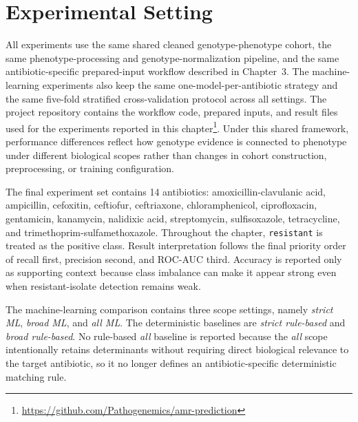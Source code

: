 \section{Experimental Setting}

All experiments use the same shared cleaned genotype-phenotype cohort, the same phenotype-processing and genotype-normalization pipeline, and the same antibiotic-specific prepared-input workflow described in Chapter~3. The machine-learning experiments also keep the same one-model-per-antibiotic strategy and the same five-fold stratified cross-validation protocol across all settings. The project repository contains the workflow code, prepared inputs, and result files used for the experiments reported in this chapter\footnote{\url{https://github.com/Pathogenemics/amr-prediction}}. Under this shared framework, performance differences reflect how genotype evidence is connected to phenotype under different biological scopes rather than changes in cohort construction, preprocessing, or training configuration.

The final experiment set contains 14 antibiotics: amoxicillin-clavulanic acid, ampicillin, cefoxitin, ceftiofur, ceftriaxone, chloramphenicol, ciprofloxacin, gentamicin, kanamycin, nalidixic acid, streptomycin, sulfisoxazole, tetracycline, and trimethoprim-sulfamethoxazole. Throughout the chapter, \texttt{resistant} is treated as the positive class. Result interpretation follows the final priority order of recall first, precision second, and ROC-AUC third. Accuracy is reported only as supporting context because class imbalance can make it appear strong even when resistant-isolate detection remains weak.

The machine-learning comparison contains three scope settings, namely \textit{strict ML}, \textit{broad ML}, and \textit{all ML}. The deterministic baselines are \textit{strict rule-based} and \textit{broad rule-based}. No rule-based \textit{all} baseline is reported because the \textit{all} scope intentionally retains determinants without requiring direct biological relevance to the target antibiotic, so it no longer defines an antibiotic-specific deterministic matching rule.

